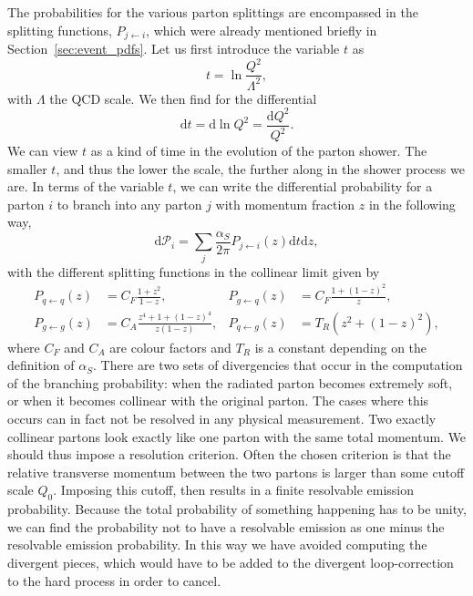 The probabilities for the various parton splittings are encompassed in the splitting functions,
$P_{j\leftarrow i}$, which were already mentioned briefly in Section~\ref{sec:event_pdfs}.
Let us first introduce the variable $t$ as
\begin{equation}
  t = \ln\frac{Q^2}{\Lambda^2},
\end{equation}
with $\Lambda$ the QCD scale. We then find for the differential
\begin{equation}
  \text{d}t = \text{d}\ln Q^2 = \frac{\text{d}Q^2}{Q^2}.
\end{equation}
We can view $t$ as a kind of time in the evolution of the parton shower. The smaller $t$, and
thus the lower the scale, the further along in the shower process we are. 
In terms of the variable $t$, we can write the differential probability for a parton $i$ to branch
into any parton $j$ with momentum fraction $z$ in the following way,
\begin{equation}
  \text{d}\mathcal{P}_i = \sum_j \frac{\alpha_S}{2\pi} P_{j\leftarrow i}(z)\text{d}t\text{d}z,
\label{eq:splitting}
\end{equation}
with the different splitting functions in the collinear limit given by
\begin{align}
  P_{q\leftarrow q}(z) &= C_F \frac{1 + z^2}{1 - z}, & 
  P_{g\leftarrow q}(z) &= C_F \frac{1 + (1-z)^2}{z}, \\
  P_{g\leftarrow g}(z) &= C_A \frac{z^4 + 1 + (1-z)^4}{z(1-z)}, &
  P_{q\leftarrow g}(z) &= T_R (z^2 + (1-z)^2), 
\end{align}
where $C_F$ and $C_A$ are colour factors and $T_R$ is a constant depending on the definition of
$\alpha_S$. 
There are two sets of divergencies that occur in the computation of the branching probability: when
the radiated parton becomes extremely soft, or when it becomes collinear with the original parton. 
The cases where this occurs can in fact not be resolved in any physical measurement. Two exactly
collinear partons look exactly like one parton with the same total momentum. We should thus impose
a resolution criterion. Often the chosen criterion is that the relative transverse momentum
between the two partons is larger than some cutoff scale $Q_0$. Imposing this cutoff, then results
in a finite resolvable emission probability. Because the total probability of something happening
has to be unity, we can find the probability not to have a resolvable emission as one minus the
resolvable emission probability. In this way we have avoided computing the divergent pieces, which
would have to be added to the divergent loop-correction to the hard process in order to cancel.

